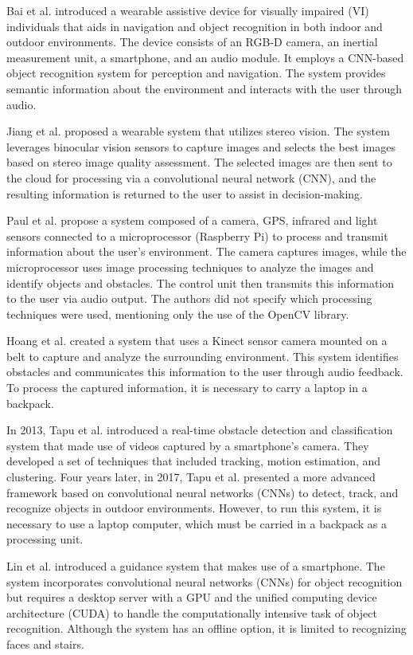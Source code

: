 \documentclass[preprint,12pt]{elsarticle}
\begin{document}
Bai et al. \cite{bai2019} introduced a wearable assistive device for visually impaired (VI) individuals that aids in navigation and object recognition in both indoor and outdoor environments. The device consists of an RGB-D camera, an inertial measurement unit, a smartphone, and an audio module. It employs a CNN-based object recognition system for perception and navigation. The system provides semantic information about the environment and interacts with the user through audio.

Jiang et al. \cite{jiang2019} proposed a wearable system that utilizes stereo vision. The system leverages binocular vision sensors to capture images and selects the best images based on stereo image quality assessment. The selected images are then sent to the cloud for processing via a convolutional neural network (CNN), and the resulting information is returned to the user to assist in decision-making.

Paul et al. \cite{joe2019} propose a system composed of a camera, GPS, infrared and light sensors connected to a microprocessor (Raspberry Pi) to process and transmit information about the user's environment. The camera captures images, while the microprocessor uses image processing techniques to analyze the images and identify objects and obstacles. The control unit then transmits this information to the user via audio output. The authors did not specify which processing techniques were used, mentioning only the use of the OpenCV library.

Hoang et al. \cite{hoang2017} created a system that uses a Kinect sensor camera mounted on a belt to capture and analyze the surrounding environment. This system identifies obstacles and communicates this information to the user through audio feedback. To process the captured information, it is necessary to carry a laptop in a backpack.

In 2013, Tapu et al. \cite{tapu2013} introduced a real-time obstacle detection and classification system that made use of videos captured by a smartphone's camera. They developed a set of techniques that included tracking, motion estimation, and clustering. Four years later, in 2017, Tapu et al. \cite{tapu2017} presented a more advanced framework based on convolutional neural networks (CNNs) to detect, track, and recognize objects in outdoor environments. However, to run this system, it is necessary to use a laptop computer, which must be carried in a backpack as a processing unit.

Lin et al. \cite{lin2017} introduced a guidance system that makes use of a smartphone. The system incorporates convolutional neural networks (CNNs) for object recognition but requires a desktop server with a GPU and the unified computing device architecture (CUDA) to handle the computationally intensive task of object recognition. Although the system has an offline option, it is limited to recognizing faces and stairs.
\end{document}
